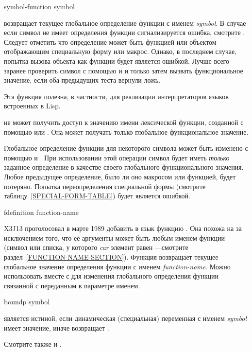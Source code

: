 \begin{defun}[Function]
symbol-function symbol

 возвращает текущее глобальное определение функции с именем
\emph{symbol}. В случае если символ не имеет определения функции сигнализируется
ошибка, смотрите . Следует отметить что определение может быть
функцией или объектом отображающим специальную форму или макрос.
Однако, в последнем случае, попытка вызова объекта как функции будет является
ошибкой.
Лучше всего заранее проверить символ с помощью  и
 и только затем вызвать функциональное значение, если оба
предыдущих теста вернули ложь.

Эта функция полезна, в частности, для реализации интерпретаторов языков
встроенных в Lisp.

 не может получить доступ к значению имени лексической
функции, созданной с помощью  или . Она может получать
только глобальное функциональное значение.

Глобальное определение функции для некоторого символа может быть изменено с
помощью  и .
При использовании этой операции символ будет иметь \emph{только} заданное определение в качестве своего
глобального функционального значения. Любое предыдущее определение, было ли оно
макросом или функцией, будет потеряно.
Попытка переопределения специальной формы (смотрите
таблицу~\ref{SPECIAL-FORM-TABLE}) будет является ошибкой.
\end{defun}

\begin{newer}
\begin{defun}[Function]
fdefinition function-name

X3J13 проголосовал в марте 1989  добавить в язык функцию
.
Она похожа на  
за исключением того, что её аргументы может быть любым именем функции (символ
или списка, у которого \emph{car} элемент равен ---смотрите раздел~\ref{FUNCTION-NAME-SECTION}).
Функция возвращает текущее глобальное значение определения функции с именем \emph{function-name}.
Можно использовать  вместе с 
для изменения глобального определения функции связанной с переданным в параметре
именем.
\end{defun}
\end{newer}

\begin{defun}[Function]
boundp symbol

 является истиной, если динамическая (специальная) переменная с
именем \emph{symbol} имеет значение, иначе возвращает {\false}.

Смотрите также  и .
\end{defun}

